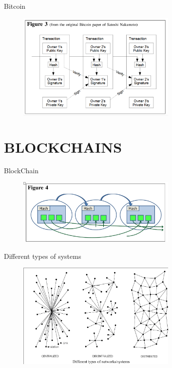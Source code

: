 \documentclass[serif]{beamer}
\begin{document}
\begin{frame}{Bitcoin}
		\begin{figure}
			\includegraphics[width=0.7\textwidth]{bit}
			\label{fig:bit}
		\end{figure}
	
\end{frame}


\section{BLOCKCHAINS}
\begin{frame}{BlockChain}
	\begin{figure}
		\includegraphics[width=0.7\textwidth]{block}
		\label{fig:block}
	\end{figure}
	
\end{frame}


\begin{frame}{Different types of systems}
	
	\begin{figure}
		\includegraphics[width=0.7\textwidth]{types}
		\label{fig:4D}
	\end{figure}

\end{frame}
\end{document}
